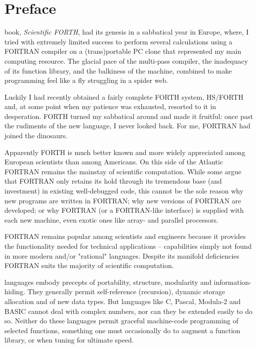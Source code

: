 \chapter{Preface}
\startcontents[chapters]

 book, \textit{Scientific FORTH}, had its genesis in a sabbatical year in Europe, where, I tried with extremely limited success to perform several calculations using a FORTRAN compiler on a (trans)portable PC clone that represented my main computing resource. The glacial pace of the multi-pass compiler, the inadequacy of its function library, and the balkiness of the machine, combined to make programming feel like a fly struggling in a spider web.

Luckily I had recently obtained a fairly complete FORTH system, HS/FORTH  and, at some point when my patience was exhausted, resorted to it in desperation. FORTH turned my sabbatical around and made it fruitful: once past the rudiments of the new language, I never looked back. For me, FORTRAN had joined the dinosaurs.

Apparently FORTH is much better known and more widely appreciated among European scientists than among Americans. On this side of the Atlantic FORTRAN remains the mainstay of scientific computation. While some argue that FORTRAN only retains its hold through its tremendous base (and investment) in existing well-debugged code, this cannot be the sole reason why new programs are written in FORTRAN; why new versions of FORTRAN are developed; or why FORTRAN (or a FORTRAN-like interface) is supplied with each new machine, even exotic ones like array- and parallel processors.

FORTRAN remains popular among scientists and engineers because it provides the functionality needed for technical applications -- capabilities simply not found in more modern and/or "rational" languages. Despite its manifold deficiencies FORTRAN suits the majority of scientific computation.

 languages embody precepts of portability, structure, modularity and information-hiding. They generally permit self-reference (recursion), dynamic storage allocation and of new data types. But languages like C, Pascal, Modula-2 and BASIC cannot deal with complex numbers, nor can they be extended easily to do so. Neither do these languages permit graceful machine-code programming of selected functions, something one must occasionally do to augment a function library, or when tuning for ultimate speed.
 
